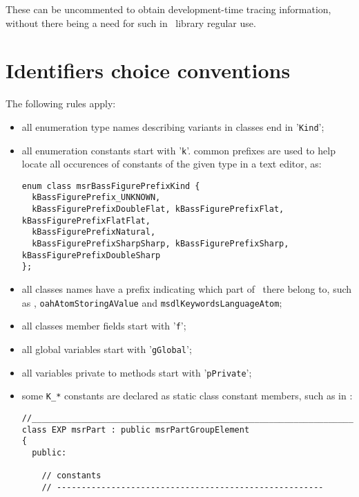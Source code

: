 These can be uncommented to obtain development-time tracing information, without there being a need for such in \mf\ library regular use.


\section{Identifiers choice conventions}

The following rules apply:
\begin{itemize}

\item all enumeration type names describing variants in classes end in '{\tt Kind}';%
\item all enumeration constants start with '{\tt k}'. common prefixes are used to help locate all occurences of constants of the given type in a text editor, as:
\begin{lstlisting}[language=CPlusPlus]
enum class msrBassFigurePrefixKind {
  kBassFigurePrefix_UNKNOWN,
  kBassFigurePrefixDoubleFlat, kBassFigurePrefixFlat, kBassFigurePrefixFlatFlat,
  kBassFigurePrefixNatural,
  kBassFigurePrefixSharpSharp, kBassFigurePrefixSharp, kBassFigurePrefixDoubleSharp
};
\end{lstlisting}

\item all classes names have a prefix indicating which part of \mf\ there belong to, such as , {\tt oahAtomStoringAValue} and {\tt msdlKeywordsLanguageAtom};

\item all classes member fields start with '{\tt f}';

\item all global variables start with '{\tt gGlobal}';

\item all variables private to methods start with '{\tt pPrivate}';

\item some {\tt K_*} constants are declared as static class constant members, such as in :
\begin{lstlisting}[language=CPlusPlus]
//______________________________________________________________________________
class EXP msrPart : public msrPartGroupElement
{
  public:

    // constants
    // ------------------------------------------------------


\end{lstlisting}
\end{itemize}
